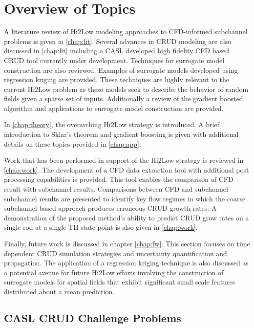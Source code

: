 \section{Overview of Topics}

A literature review of Hi2Low modeling approaches to CFD-informed subchannel
problems is given in \autoref{chap:lit}.  Several advances in CRUD modeling are
also discussed in \autoref{chap:lit} including a CASL developed high fidelity
CFD based CRUD tool currently under development.  Techniques for surrogate
model construction are also reviewed.  Examples of surrogate models developed
using regression kriging are provided.  These techniques are highly relevant to
the current Hi2Low problem as these models seek to describe the behavior of
random fields given a sparse set of inputs.  Additionally a review of the
gradient boosted algorithm and applications to surrogate model construction are
provided.

In \autoref{chap:theory}, the overarching Hi2Low strategy is introduced.  A
brief introduction to Sklar's theorem and gradient boosting is given with
additional details on these topics provided in \autoref{chap:app}.

Work that has been performed in support of the Hi2Low strategy is reviewed in
\autoref{chap:work}.  The development of a CFD data extraction tool with
additional post processing capabilities is provided.  This tool enables the
comparison of CFD result with subchannel results.  Comparisons between CFD and
subchannel subchannel results are presented to identify key flow regimes in
which the coarse subchannel based approach produces erroneous CRUD growth
rates.  A demonstration of the proposed method's ability to predict CRUD grow
rates on a single rod at a single TH state point is also given in
\autoref{chap:work}.

Finally, future work is discussed in chapter \autoref{chap:fw}.  This section
focuses on time dependent CRUD simulation strategies and uncertainty
quantification and propagation.  The application of a regression kriging
technique is also discussed as a potential avenue for future Hi2Low efforts
involving the construction of surrogate models for spatial fields that exhibit
significant small scale features distributed about a mean prediction.

\subsection{CASL CRUD Challenge Problems}

